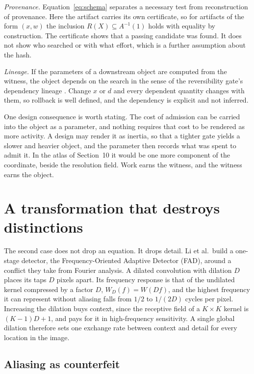 \documentclass[11pt]{article}
\theoremstyle{definition}
\theoremstyle{remark}
\begin{document}
\emph{Provenance.} Equation~\eqref{eq:schema} separates a necessary test from reconstruction of provenance. Here the artifact carries its own certificate, so for artifacts of the form $(x,w)$ the inclusion $R(X)\subseteq A^{-1}(1)$ holds with equality by construction. The certificate shows that a passing candidate was found. It does not show who searched or with what effort, which is a further assumption about the hash.

\emph{Lineage.} If the parameters of a downstream object are computed from the witness, the object depends on the search in the sense of the reversibility gate's dependency lineage \cite{revgate}. Change $x$ or $d$ and every dependent quantity changes with them, so rollback is well defined, and the dependency is explicit and not inferred.

One design consequence is worth stating. The cost of admission can be carried into the object as a parameter, and nothing requires that cost to be rendered as more activity. A design may render it as inertia, so that a tighter gate yields a slower and heavier object, and the parameter then records what was spent to admit it. In the atlas of Section~10 it would be one more component of the coordinate, beside the resolution field. Work earns the witness, and the witness earns the object.

\section{A transformation that destroys distinctions}

The second case does not drop an equation. It drops detail. Li et al.\ build a one-stage detector, the Frequency-Oriented Adaptive Detector (FAD), around a conflict they take from Fourier analysis. A dilated convolution with dilation $D$ places its taps $D$ pixels apart. Its frequency response is that of the undilated kernel compressed by a factor $D$, $W_D(f)=W(Df)$, and the highest frequency it can represent without aliasing falls from $1/2$ to $1/(2D)$ cycles per pixel. Increasing the dilation buys context, since the receptive field of a $K\times K$ kernel is $(K-1)D+1$, and pays for it in high-frequency sensitivity. A single global dilation therefore sets one exchange rate between context and detail for every location in the image.

\subsection{Aliasing as counterfeit}
\end{document}
